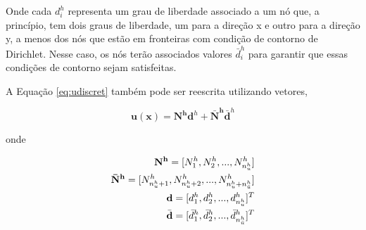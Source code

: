 Onde cada $d_i^h$ representa um grau de liberdade associado a um nó que, a princípio,  tem dois graus de liberdade, um para a direção x e outro para a direção y, a menos dos nós que estão em fronteiras com condição de contorno de Dirichlet. Nesse caso, os nós terão associados valores $\bar{d}_i^h$ para garantir que essas condições de contorno sejam satisfeitas. 




A Equação \eqref{eq:udiscret} também pode ser reescrita utilizando vetores,

\begin{equation}\label{eq:udiscretvetor}
\mathbf{u}(\mathbf{x}) = \mathbf{N^h} \mathbf{d}^h + \mathbf{\bar{N}^h} \mathbf{\bar{d}}^h
\end{equation}

onde 

\begin{eqnarray*}
\mathbf{N^h} = [N^h_1, N^h_2, ..., N^h_{n_u^h} ] \\
\mathbf{\bar{N}^h}  =[N^h_{n_u^h + 1}, N^h_{n_u^h + 2}, ..., N^h_{n_u^h + n_{\bar{u}}^h}] \\
\mathbf{d} = [d_1^h, d_2^h, ... , d_{n_u^h}^h]^T \\
\bar{\mathbf{d}} = [\bar{d}_1^h, \bar{d}_2^h, ... , \bar{d}_{n_{\bar{u}}^h}^h]^T
\end{eqnarray*}



